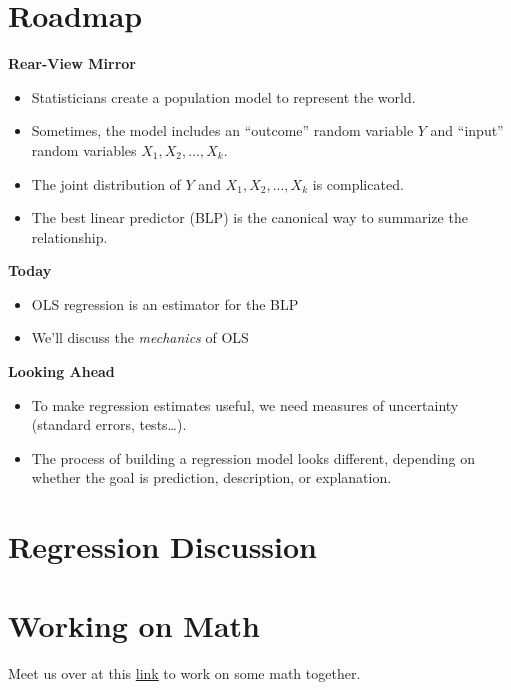 \documentclass[
]{book}
\providecommand{\tightlist}{%
  \setlength{\itemsep}{0pt}\setlength{\parskip}{0pt}}
\theoremstyle{definition}
\theoremstyle{definition}
\theoremstyle{definition}
\theoremstyle{definition}
\theoremstyle{remark}
\begin{document}
\hypertarget{roadmap-5}{%
\section{Roadmap}\label{roadmap-5}}

\textbf{Rear-View Mirror}

\begin{itemize}
\tightlist
\item
  Statisticians create a population model to represent the world.
\item
  Sometimes, the model includes an ``outcome'' random variable \(Y\) and ``input'' random variables \(X_1, X_2,...,X_k\).
\item
  The joint distribution of \(Y\) and \(X_1, X_2,...,X_k\) is complicated.
\item
  The best linear predictor (BLP) is the canonical way to summarize the relationship.
\end{itemize}

\textbf{Today}

\begin{itemize}
\tightlist
\item
  OLS regression is an estimator for the BLP
\item
  We'll discuss the \emph{mechanics} of OLS
\end{itemize}

\textbf{Looking Ahead}

\begin{itemize}
\tightlist
\item
  To make regression estimates useful, we need measures of uncertainty (standard errors, tests\ldots).
\item
  The process of building a regression model looks different, depending on whether the goal is prediction, description, or explanation.
\end{itemize}

\hypertarget{regression-discussion}{%
\section{Regression Discussion}\label{regression-discussion}}

\hypertarget{working-on-math}{%
\section{Working on Math}\label{working-on-math}}

Meet us over at this \href{https://miro.com/welcomeonboard/OWZ3SHlpeVBMYjdnc2xXUFhzQVNWaFpnTkg2dmF1Z3I1UUJBWVZobWFOeVduSHJNTTRSQUt3akVyQUt0MnAyM3wzNDU4NzY0NTE4MDA4MjA1NTc3?invite_link_id=319921528710}{link} to work on some math together.
\end{document}
